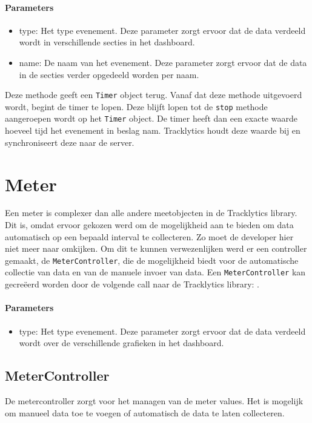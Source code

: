 \paragraph{Parameters}
\begin{itemize}
\item type: Het type evenement. Deze parameter zorgt ervoor dat de data verdeeld wordt in verschillende secties in het dashboard.
\item name: De naam van het evenement. Deze parameter zorgt ervoor dat de data in de secties verder opgedeeld worden per naam.
\end{itemize} 

Deze methode geeft een \texttt{Timer} object terug. Vanaf dat deze methode uitgevoerd wordt, begint de timer te lopen. Deze blijft lopen tot de \texttt{\justify stop} methode aangeroepen wordt op het \texttt{Timer} object. De timer heeft dan een exacte waarde hoeveel tijd het evenement in beslag nam. Tracklytics houdt deze waarde bij en synchroniseert deze naar de server. 


\section{Meter}
Een meter is complexer dan alle andere meetobjecten in de Tracklytics library. Dit is, omdat ervoor gekozen werd om de mogelijkheid aan te bieden om data automatisch op een bepaald interval te collecteren. Zo moet de developer hier niet meer naar omkijken. Om dit te kunnen verwezenlijken werd er een controller gemaakt, de \texttt{MeterController}, die de mogelijkheid biedt voor de automatische collectie van data en van de manuele invoer van data. Een \texttt{MeterController} kan gecre\"eerd worden door de volgende call naar de Tracklytics library: \texttt{}. 

\paragraph{Parameters}
\begin{itemize}
\item type: Het type evenement. Deze parameter zorgt ervoor dat de data verdeeld wordt over de verschillende grafieken in het dashboard.
\end{itemize}

\subsection{MeterController}
De metercontroller zorgt voor het managen van de meter values. Het is mogelijk om manueel data toe te voegen of automatisch de data te laten collecteren. \\

